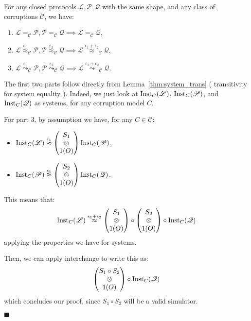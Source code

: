 \begin{theorem}
  \label{thm:prot_trans}
  For any closed protocols $\mathscr{L}, \mathscr{P}, \mathscr{Q}$ with the same shape,
  and any class of corruptions $\mathscr{C}$, we have:
  \begin{enumerate}
    \item $\mathscr{L} =_{\mathscr{C}} \mathscr{P}, \mathscr{P} =_{\mathscr{C}} \mathscr{Q} \implies \mathscr{L} =_{\mathscr{C}}\mathscr{Q}$,
    \item $\mathscr{L} \overset{\epsilon_1}{\approx}_{\mathscr{C}} \mathscr{P}, \mathscr{P} \overset{\epsilon_2}{\approx}_{\mathscr{C}} \mathscr{Q} \implies \mathscr{L} \overset{\epsilon_1 + \epsilon_2}{\approx}_{\mathscr{C}} \mathscr{Q}$,
    \item $\mathscr{L} \overset{\epsilon_1}{\leadsto}_{\mathscr{C}} \mathscr{P}, \mathscr{P} \overset{\epsilon_2}{\leadsto}_{\mathscr{C}} \mathscr{Q} \implies \mathscr{L} \overset{\epsilon_1 + \epsilon_2}{\leadsto}_{\mathscr{C}} \mathscr{Q}$.
  \end{enumerate}

   The first two parts follow directly from Lemma~\ref{thm:system_trans} (
    transitivity for system equality
  ).
  Indeed, we just look at $\text{Inst}_C(\mathscr{L})$, $\text{Inst}_C(\mathscr{P})$, and $\text{Inst}_C(\mathscr{Q})$
  as systems, for any corruption model $C$.

  For part 3, by assumption we have, for any $C \in \mathscr{C}$:
  \begin{itemize}
  \item $\text{Inst}_C(\mathscr{L}) \overset{\epsilon_1}{\approx} \begin{pmatrix} S_1\cr \otimes\cr 1(O)\end{pmatrix} \text{Inst}_C(\mathscr{P})$,
  \item $\text{Inst}_C(\mathscr{P}) \overset{\epsilon_1}{\approx} \begin{pmatrix} S_2\cr \otimes\cr 1(O)\end{pmatrix} \text{Inst}_C(\mathscr{Q})$.
  \end{itemize}
  This means that:
  $$
  \text{Inst}_C(\mathscr{L}) \overset{\epsilon_1 + \epsilon_2}{\approx}
  \begin{pmatrix}
    S_1 \cr
    \otimes\cr
    1(O)
  \end{pmatrix}
  \circ
  \begin{pmatrix}
    S_2 \cr
    \otimes\cr
    1(O)
  \end{pmatrix}
  \circ
  \text{Inst}_C(\mathscr{Q})
  $$
  applying the properties we have for systems.

  Then, we can apply interchange to write this as:
  $$
  \begin{pmatrix}
    S_1 \circ S_2 \cr
    \otimes\cr
    1(O)
  \end{pmatrix}
  \circ
  \text{Inst}_C(\mathscr{Q})
  $$
  which concludes our proof, since $S_1 \circ S_2$ will be a valid simulator.

  $\blacksquare$
\end{theorem}

